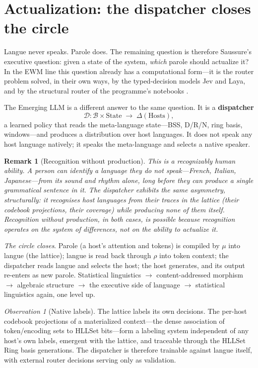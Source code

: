 \documentclass[11pt,a4paper]{article}
\newtheorem{remark}[principle]{Remark}
\theoremstyle{remark}
\newtheorem{observation}[principle]{Observation}
\newcommand{\Lat}{\ensuremath{\mathcal{B}}}              %
\newcommand{\Ing}{\ensuremath{\mu}}                      %
\newcommand{\Mat}{\ensuremath{\rho}}                     %
\newcommand{\Disp}{\ensuremath{\mathcal{D}}}             %
\begin{document}
\section{Actualization: the dispatcher closes the circle}
\label{sec:dispatch}

Langue never speaks. Parole does. The remaining question is therefore
Saussure's executive question: given a state of the system, \emph{which}
parole should actualize it? In the EWM line this question already has a
computational form---it is the router problem solved, in their own ways, by the
typed-decision models Jev and Laya, and by the structural router of the
programme's notebooks \cite{state2026}.

The Emerging LLM is a different answer to the same question. It is a
\textbf{dispatcher}
\[
  \Disp : \Lat \times \mathrm{State} \;\longrightarrow\; \Delta(\mathrm{Hosts}),
\]
a learned policy that reads the meta-language state---BSS, D/R/N, ring basis,
windows---and produces a distribution over host languages. It does not speak
any host language natively; it speaks the meta-language and selects a native
speaker.

\begin{remark}[Recognition without production]
This is a recognizably human ability. A person can identify a language they do
not speak---French, Italian, Japanese---from its sound and rhythm alone, long
before they can produce a single grammatical sentence in it. The dispatcher
exhibits the same asymmetry, structurally: it recognises host languages from
their traces in the lattice (their codebook projections, their coverage) while
producing none of them itself. Recognition without production, in both cases,
is possible because recognition operates on the system of differences, not on
the ability to actualize it.
\end{remark}

\emph{The circle closes}. Parole (a host's attention and tokens) is
compiled by $\Ing$ into langue (the lattice); langue is read back through
$\Mat$ into token context; the dispatcher reads langue and selects the host;
the host generates, and its output re-enters as new parole. Statistical
linguistics $\to$ content-addressed morphism $\to$ algebraic structure $\to$
the executive side of language $\to$ statistical linguistics again, one level
up.

\begin{observation}[Native labels]
The lattice labels its own decisions. The per-host codebook projections of a
materialized context---the dense association of token/encoding sets to
HLLSet bits---form a labeling system independent of any host's own labels,
emergent with the lattice, and traceable through the HLLSet Ring basis generations. The
dispatcher is therefore trainable against langue itself, with external router
decisions serving only as validation.
\end{observation}
\end{document}
